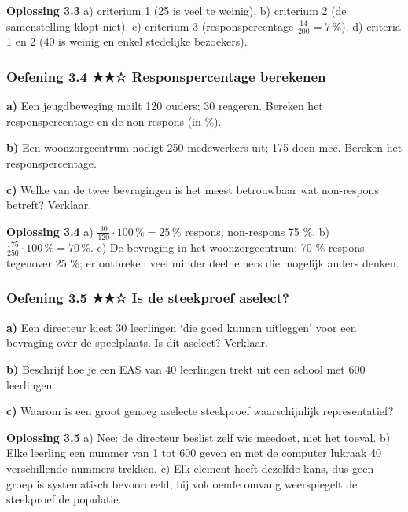 \begin{oplossing}
\textbf{Oplossing 3.3} \quad a) criterium 1 (25 is veel te weinig). b) criterium 2 (de samenstelling klopt niet). c) criterium 3 (responspercentage $\frac{14}{200}=7\,\%$). d) criteria 1 en 2 (40 is weinig en enkel stedelijke bezoekers).
\end{oplossing}

\subsubsection*{Oefening 3.4 \quad ★★☆ \quad Responspercentage berekenen}

\textbf{a)} Een jeugdbeweging mailt 120 ouders; 30 reageren. Bereken het responspercentage en de non-respons (in \%). \lijn

\textbf{b)} Een woonzorgcentrum nodigt 250 medewerkers uit; 175 doen mee. Bereken het responspercentage. \lijn

\textbf{c)} Welke van de twee bevragingen is het meest betrouwbaar wat non-respons betreft? Verklaar. \lijn

\begin{oplossing}
\textbf{Oplossing 3.4} \quad a) $\frac{30}{120}\cdot 100\,\%=25\,\%$ respons; non-respons 75 \%. b) $\frac{175}{250}\cdot 100\,\%=70\,\%$. c) De bevraging in het woonzorgcentrum: 70 \% respons tegenover 25 \%; er ontbreken veel minder deelnemers die mogelijk anders denken.
\end{oplossing}

\subsubsection*{Oefening 3.5 \quad ★★☆ \quad Is de steekproef aselect?}

\textbf{a)} Een directeur kiest 30 leerlingen ‘die goed kunnen uitleggen’ voor een bevraging over de speelplaats. Is dit aselect? Verklaar. \lijn

\textbf{b)} Beschrijf hoe je een EAS van 40 leerlingen trekt uit een school met 600 leerlingen. \lijn

\textbf{c)} Waarom is een groot genoeg aselecte steekproef waarschijnlijk representatief? \lijn

\begin{oplossing}
\textbf{Oplossing 3.5} \quad a) Nee: de directeur beslist zelf wie meedoet, niet het toeval. b) Elke leerling een nummer van 1 tot 600 geven en met de computer lukraak 40 verschillende nummers trekken. c) Elk element heeft dezelfde kans, dus geen groep is systematisch bevoordeeld; bij voldoende omvang weerspiegelt de steekproef de populatie.
\end{oplossing}

